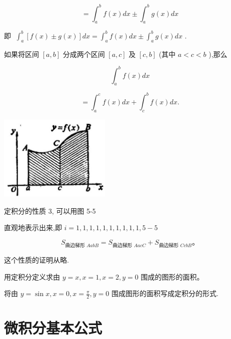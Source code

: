 \documentclass[lang=cn,newtx,12pt,scheme=chinese]{elegantbook}
\begin{document}
\[
= {\int }_{a}^{b}f\left( x\right) {dx} \pm {\int }_{a}^{b}g\left( x\right) {dx}
\]

即 \(\;{\int }_{a}^{b}\left\lbrack {f\left( x\right) \pm g\left( x\right) }\right\rbrack {dx} = {\int }_{a}^{b}f\left( x\right) {dx} \pm {\int }_{a}^{b}g\left( x\right) {dx}\) .

\begin{proposition}[性质3]

如果将区间 \(\left\lbrack {a,b}\right\rbrack\) 分成两个区间 \(\left\lbrack {a,c}\right\rbrack\) 及 \(\left\lbrack {c,b}\right\rbrack\) (其中 \(a < c < b\) ),那么

\[
{\int }_{a}^{b}f\left( x\right) {dx}
\]

\[
= {\int }_{a}^{c}f\left( x\right) {dx} + {\int }_{c}^{b}f\left( x\right) {dx}.
\]

\end{proposition}

\begin{center}
\includegraphics[max width=0.4\textwidth]{images/01912c18-5c3f-733d-b775-749ba9897a9d_224_842112.jpg}
\end{center}

定积分的性质 3, 可以用图 5-5

直观地表示出来,即 \(i = 1,1,1,1,1,1,1,1,1,1,5 - 5\)

\[
{S}_{\text{曲边梯形 }{AabB}} = {S}_{\text{曲边梯形 }{AacC}} + {S}_{\text{曲边梯形 }{CcbB}}\text{。}
\]

这个性质的证明从略.

\begin{problemset}[练习]

\item 用定积分定义求由 \(y = x,x = 1,x = 2,y = 0\) 围成的图形的面积。

\item 将由 \(y = \sin x,x = 0,x = \frac{\pi }{2},y = 0\) 围成图形的面积写成定积分的形式.

\end{problemset}

\section{微积分基本公式}
\end{document}
